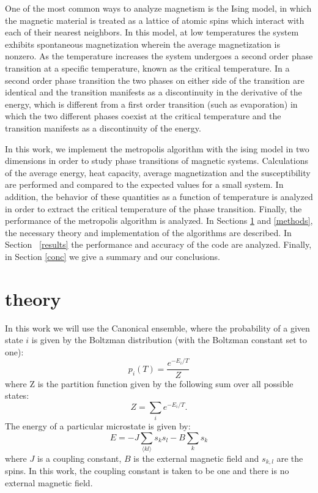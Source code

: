 \documentclass[prc,amsmath,twocolumn,superscriptaddress]{revtex4}
\begin{document}
One of the most common ways to analyze magnetism is the Ising model, in which the magnetic material is treated as a lattice of atomic spins which interact with each of their nearest neighbors. In this model, at low temperatures the system exhibits spontaneous magnetization wherein the average magnetization is nonzero. As the temperature increases the system undergoes a second order phase transition at a specific temperature, known as the critical temperature. In a second order phase transition the two phases on either side of the transition are identical and the transition manifests as a discontinuity in the derivative of the energy, which is different from a first order transition (such as evaporation) in which the two different phases coexist at the critical temperature and the transition manifests as a discontinuity of the energy.

In this work, we implement the metropolis algorithm with the ising model in two dimensions in order to study phase transitions of magnetic systems. Calculations of the average energy, heat capacity, average magnetization and the susceptibility are performed and compared to the expected values for a small system. In addition, the behavior of these quantities as a function of temperature is analyzed in order to extract the critical temperature of the phase transition. Finally, the performance of the metropolis algorithm is analyzed. In Sections \ref{theory} and \ref{methods}, the necessary theory and implementation of the algorithms are described. In Section ~\ref{results} the performance and accuracy of the code are analyzed. Finally, in Section \ref{conc} we give a summary and our conclusions.

\section{theory}
\label{theory}
In this work we will use the Canonical ensemble, where the probability of a given state $i$ is given by the Boltzman distribution (with the Boltzman constant set to one):
\begin{equation}
p_i(T) = \frac{e^{-E_i/T}}{Z}
\end{equation}
where Z is the partition function given by the following sum over all possible states:
\begin{equation}
Z=\sum_i e^{-E_i/T}.
\end{equation}
The energy of a particular microstate is given by:
\begin{equation}
E= -J\sum_{\langle kl \rangle} s_ks_l-B\sum_k s_k
\end{equation}
where $J$ is a coupling constant, $B$ is the external magnetic field and $s_{k,l}$ are the spins. In this work, the coupling constant is taken to be one and there is no external magnetic field.
\end{document}
